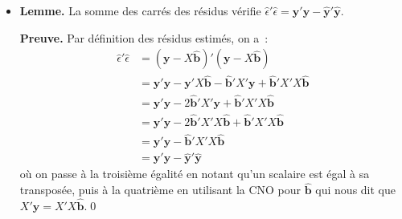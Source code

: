 \documentclass[10pt]{beamer}
\theoremstyle{plain}
\begin{document}
\begin{notes}
  \begin{itemize}

  \item \textbf{Lemme.} La somme des carrés des résidus vérifie $\hat\epsilon'\hat\epsilon = \mathbf y'\mathbf y - \hat{\mathbf y}'\hat{\mathbf y}$.\newline

    \textbf{Preuve.} Par définition des résidus estimés, on a~:
    \[
      \begin{split}
        \hat\epsilon'\hat\epsilon &= (\mathbf y-X\hat{\mathbf b})'(\mathbf y-X\hat{\mathbf b})\\
                                  &= \mathbf y'\mathbf y - \mathbf y'X\hat{\mathbf b} - \hat{\mathbf b}'X'\mathbf y + \hat{\mathbf b}'X'X\hat{\mathbf b}\\
                                  &= \mathbf y'\mathbf y - 2\hat{\mathbf b}'X'\mathbf y + \hat{\mathbf b}'X'X\hat{\mathbf b}\\
                                  &= \mathbf y'\mathbf y - 2\hat{\mathbf b}'X'X\hat{\mathbf b} + \hat{\mathbf b}'X'X\hat{\mathbf b}\\
                                  &= \mathbf y'\mathbf y - \hat{\mathbf b}'X'X\hat{\mathbf b}\\
                                  &= \mathbf y'\mathbf y - \hat{\mathbf y}'\hat{\mathbf y}
      \end{split}
    \]
où on passe à la troisième égalité en notant qu'un scalaire est égal à sa transposée, puis à la quatrième en utilisant la CNO pour $\hat{\mathbf b}$ qui nous dit que $X'\mathbf y = X'X \hat{\mathbf b}$.\qed\newline


\end{itemize}
\end{notes}
\end{document}
